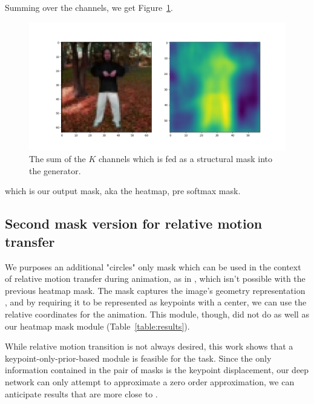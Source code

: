 \documentclass{article}
\begin{document}
Summing over the channels, we get Figure~\ref{mask-sum}.

\begin{figure}[ht]
\vskip 0.2in
\begin{center}
\centerline{\includegraphics[width=\columnwidth]{visualizations/mask_sum}}
\caption{
The sum of the $K$ channels which is fed as a structural mask into the
generator.
}
\label{mask-sum}
\end{center}
\vskip -0.2in
\end{figure}
which is our output mask, aka the heatmap, pre softmax mask.

\subsection{Second mask version for relative motion transfer}
We purposes an additional "circles" only mask
which can be used in the context
of relative motion transfer during animation, as in
\cite{siarohin2020order}, which isn't possible with the previous heatmap mask.
The mask captures the image's geometry representation \cite{wu2019transgaga},
and by requiring it to be represented as keypoints with a center, we can use
the relative coordinates for the animation. This module, though, did not do
as well as our heatmap mask module (Table~\ref{table:results}).

While relative motion transition is not always desired, this work shows that
a keypoint-only-prior-based module is feasible for the task.
Since the only information contained in the pair of masks is the keypoint
displacement, our deep network can only attempt to approximate a zero order
approximation, we can anticipate results that are more close to
\cite{siarohin2019animating}.
\end{document}
